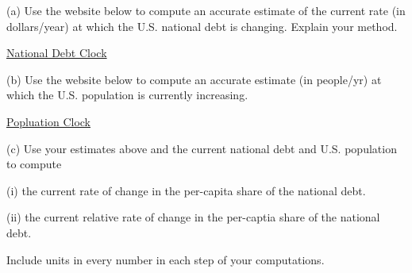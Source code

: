\documentclass{ximera}
\begin{document}
\begin{question}  \label{Qdfgggtre}
(a) Use the website below to compute an accurate estimate of the current rate (in dollars/year) at which the U.S. national debt is changing. Explain your method. 

\href{https://www.usdebtclock.org/}{National Debt Clock}

(b) Use the website below to compute an accurate estimate (in people/yr) at which the U.S. population is currently increasing.

\href{https://www.census.gov/popclock/}{Popluation Clock}

(c) Use your estimates above and the current national debt and U.S. population to compute

   (i) the current rate of change in the per-capita share of the national debt.

    (ii) the current relative rate of change in the per-captia share of the national debt.

Include units in every number in each step of your computations.

\end{question}
\end{document}
